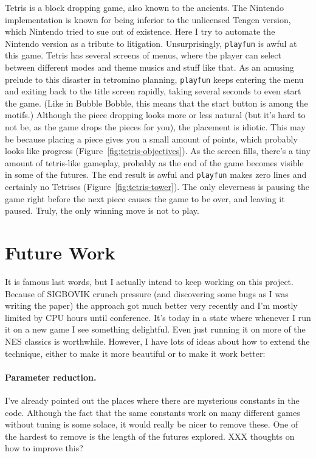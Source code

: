 \documentclass[twocolumn]{article}
\begin{document}
Tetris is a block dropping game, also known to the ancients. The
Nintendo implementation is known for being inferior to the unlicensed
Tengen version, which Nintendo tried to sue out of existence. Here I
try to automate the Nintendo version as a tribute to litigation.
Unsurprisingly, {\tt playfun} is awful at this game. Tetris has
several screens of menus, where the player can select between
different modes and theme musics and stuff like that. As an amusing
prelude to this disaster in tetromino planning, {\tt playfun} keeps
entering the menu and exiting back to the title screen rapidly, taking
several seconds to even start the game. (Like in Bubble Bobble, this
means that the start button is among the motifs.) Although the piece
dropping looks more or less natural (but it's hard to not be, as the
game drops the pieces for you), the placement is idiotic. This may be
because placing a piece gives you a small amount of points, which
probably looks like progress (Figure~\ref{fig:tetris-objectives}). As
the screen fills, there's a tiny amount of tetris-like gameplay,
probably as the end of the game becomes visible in some of the
futures. The end result is awful and {\tt playfun} makes zero lines
and certainly no Tetrises (Figure~\ref{fig:tetris-tower}). The only
cleverness is pausing the game right before the next piece causes the
game to be over, and leaving it paused. Truly, the only winning move
is not to play.

\section{Future Work}

It is famous last words, but I actually intend to keep working on this
project. Because of SIGBOVIK crunch pressure (and discovering some
bugs as I was writing the paper) the approach got much better very
recently and I'm mostly limited by CPU hours until conference. It's
today in a state where whenever I run it on a new game I see something
delightful. Even just running it on more of the NES classics is
worthwhile. However, I have lots of ideas about how to extend the
technique, either to make it more beautiful or to make it work better:

\paragraph{Parameter reduction.} I've already pointed out the places
where there are mysterious constants in the code. Although the fact
that the same constants work on many different games without tuning
is some solace, it would really be nicer to remove these. One of the
hardest to remove is the length of the futures explored. XXX thoughts
on how to improve this?
\end{document}
